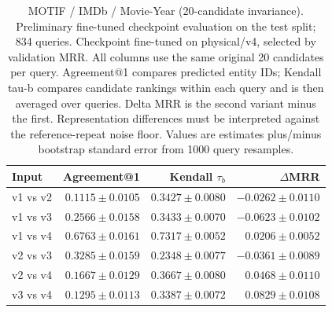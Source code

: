 \begin{table}[t]
\centering
\small
\begin{tabular}{lrrr}
\toprule
Input & Agreement@1 & Kendall $\tau_b$ & $\Delta$MRR \\
\midrule
v1 vs v2 & $0.1115 \pm 0.0105$ & $0.3427 \pm 0.0080$ & $-0.0262 \pm 0.0110$ \\
v1 vs v3 & $0.2566 \pm 0.0158$ & $0.3433 \pm 0.0070$ & $-0.0623 \pm 0.0102$ \\
v1 vs v4 & $0.6763 \pm 0.0161$ & $0.7317 \pm 0.0052$ & $0.0206 \pm 0.0052$ \\
v2 vs v3 & $0.3285 \pm 0.0159$ & $0.2348 \pm 0.0077$ & $-0.0361 \pm 0.0089$ \\
v2 vs v4 & $0.1667 \pm 0.0129$ & $0.3667 \pm 0.0080$ & $0.0468 \pm 0.0110$ \\
v3 vs v4 & $0.1295 \pm 0.0113$ & $0.3387 \pm 0.0072$ & $0.0829 \pm 0.0108$ \\
\bottomrule
\end{tabular}
\caption{MOTIF / IMDb / Movie-Year (20-candidate invariance). Preliminary fine-tuned checkpoint evaluation on the test split; 834 queries. Checkpoint fine-tuned on physical/v4, selected by validation MRR. All columns use the same original 20 candidates per query. Agreement@1 compares predicted entity IDs; Kendall tau-b compares candidate rankings within each query and is then averaged over queries. Delta MRR is the second variant minus the first. Representation differences must be interpreted against the reference-repeat noise floor. Values are estimates plus/minus bootstrap standard error from 1000 query resamples.}
\label{tab:motif-movie_year-invariance}
\end{table}
